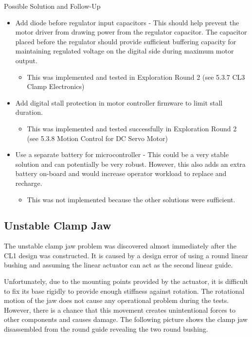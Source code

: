Possible Solution and Follow-Up
\begin{itemize}
    \item Add diode before regulator input capacitors - This should help prevent the motor driver from drawing power from the regulator capacitor. The capacitor placed before the regulator should provide sufficient buffering capacity for maintaining regulated voltage on the digital side during maximum motor output.
    \begin{itemize}
        \item This was implemented and tested in Exploration Round 2 (see 5.3.7 CL3 Clamp Electronics)
    \end{itemize}
    \item Add digital stall protection in motor controller firmware to limit stall duration. 
    \begin{itemize}
        \item This was implemented and tested successfully in Exploration Round 2 (see 5.3.8 Motion Control for DC Servo Motor)
    \end{itemize}
    \item Use a separate battery for microcontroller - This could be a very stable solution and can potentially be very robust. However, this also adds an extra battery on-board and would increase operator workload to replace and recharge. 
    \begin{itemize}
        \item This was not implemented because the other solutions were sufficient.
    \end{itemize}
\end{itemize}

\subsection{Unstable Clamp Jaw}
\label{subsection:exploration_1_unstable_clamp_jaw}

The unstable clamp jaw problem was discovered almost immediately after the CL1 design was constructed. It is caused by a design error of using a round linear bushing and assuming the linear actuator can act as the second linear guide. 

Unfortunately, due to the mounting points provided by the actuator, it is difficult to fix its base rigidly to provide enough stiffness against rotation. The rotational motion of the jaw does not cause any operational problem during the tests. However, there is a chance that this movement creates unintentional forces to other components and causes damage. The following picture shows the clamp jaw disassembled from the round guide revealing the two round bushing.

